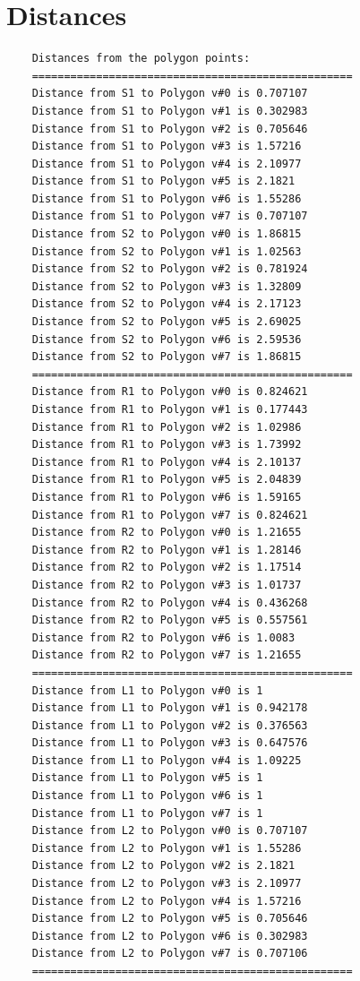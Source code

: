 \documentclass[12pt,a4paper,english]{article}
\begin{document}
\newpage

\section{Distances}

\begin{verbatim}
    Distances from the polygon points:
    ==================================================
    Distance from S1 to Polygon v#0 is 0.707107
    Distance from S1 to Polygon v#1 is 0.302983
    Distance from S1 to Polygon v#2 is 0.705646
    Distance from S1 to Polygon v#3 is 1.57216
    Distance from S1 to Polygon v#4 is 2.10977
    Distance from S1 to Polygon v#5 is 2.1821
    Distance from S1 to Polygon v#6 is 1.55286
    Distance from S1 to Polygon v#7 is 0.707107
    Distance from S2 to Polygon v#0 is 1.86815
    Distance from S2 to Polygon v#1 is 1.02563
    Distance from S2 to Polygon v#2 is 0.781924
    Distance from S2 to Polygon v#3 is 1.32809
    Distance from S2 to Polygon v#4 is 2.17123
    Distance from S2 to Polygon v#5 is 2.69025
    Distance from S2 to Polygon v#6 is 2.59536
    Distance from S2 to Polygon v#7 is 1.86815
    ==================================================
    Distance from R1 to Polygon v#0 is 0.824621
    Distance from R1 to Polygon v#1 is 0.177443
    Distance from R1 to Polygon v#2 is 1.02986
    Distance from R1 to Polygon v#3 is 1.73992
    Distance from R1 to Polygon v#4 is 2.10137
    Distance from R1 to Polygon v#5 is 2.04839
    Distance from R1 to Polygon v#6 is 1.59165
    Distance from R1 to Polygon v#7 is 0.824621
    Distance from R2 to Polygon v#0 is 1.21655
    Distance from R2 to Polygon v#1 is 1.28146
    Distance from R2 to Polygon v#2 is 1.17514
    Distance from R2 to Polygon v#3 is 1.01737
    Distance from R2 to Polygon v#4 is 0.436268
    Distance from R2 to Polygon v#5 is 0.557561
    Distance from R2 to Polygon v#6 is 1.0083
    Distance from R2 to Polygon v#7 is 1.21655
    ==================================================
    Distance from L1 to Polygon v#0 is 1
    Distance from L1 to Polygon v#1 is 0.942178
    Distance from L1 to Polygon v#2 is 0.376563
    Distance from L1 to Polygon v#3 is 0.647576
    Distance from L1 to Polygon v#4 is 1.09225
    Distance from L1 to Polygon v#5 is 1
    Distance from L1 to Polygon v#6 is 1
    Distance from L1 to Polygon v#7 is 1
    Distance from L2 to Polygon v#0 is 0.707107
    Distance from L2 to Polygon v#1 is 1.55286
    Distance from L2 to Polygon v#2 is 2.1821
    Distance from L2 to Polygon v#3 is 2.10977
    Distance from L2 to Polygon v#4 is 1.57216
    Distance from L2 to Polygon v#5 is 0.705646
    Distance from L2 to Polygon v#6 is 0.302983
    Distance from L2 to Polygon v#7 is 0.707106
    ==================================================
\end{verbatim}
\end{document}
